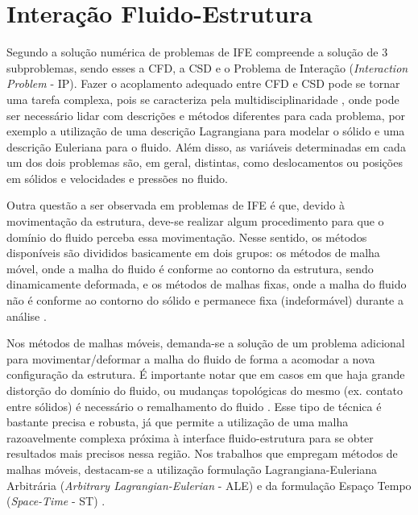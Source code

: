 \section{Interação Fluido-Estrutura} \label{IFE}

Segundo  a solução numérica de problemas de IFE compreende a solução de 3 subproblemas, sendo esses a CFD, a CSD e o Problema de Interação (\textit{Interaction Problem} - IP). Fazer o acoplamento adequado entre CFD e CSD pode se tornar uma tarefa complexa, pois se caracteriza pela multidisciplinaridade \cite{hou2012numerical}, onde pode ser necessário lidar com descrições e métodos diferentes para cada problema, por exemplo a utilização de uma descrição Lagrangiana para modelar o sólido e uma descrição Euleriana para o fluido. Além disso, as variáveis determinadas em cada um dos dois problemas são, em geral, distintas, como deslocamentos ou posições em sólidos e velocidades e pressões no fluido.

Outra questão a ser observada em problemas de IFE é que, devido à movimentação da estrutura, deve-se realizar algum procedimento para que o domínio do fluido perceba essa movimentação. Nesse sentido, os métodos disponíveis são divididos basicamente em dois grupos: os métodos de malha móvel, onde a malha do fluido é conforme ao contorno da estrutura, sendo dinamicamente deformada, e os métodos de malhas fixas, onde a malha do fluido não é conforme ao contorno do sólido e permanece fixa (indeformável) durante a análise \cite{fernandes2020tecnica}.

Nos métodos de malhas móveis, demanda-se a solução de um problema adicional para movimentar/deformar a malha do fluido de forma a acomodar a nova configuração da estrutura. É importante notar que em casos em que haja grande distorção do domínio do fluido, ou mudanças topológicas do mesmo (ex. contato entre sólidos) é necessário o remalhamento do fluido \cite{terahara2020heart}. Esse tipo de técnica é bastante precisa e robusta, já que permite a utilização de uma malha razoavelmente complexa próxima à interface fluido-estrutura para se obter resultados mais precisos nessa região. Nos trabalhos que empregam métodos de malhas móveis, destacam-se a utilização formulação Lagrangiana-Euleriana Arbitrária (\textit{Arbitrary Lagrangian-Eulerian} - ALE) \cite{donea1982arbitrary,kanchi20073d,fernandes2019ale} e da formulação Espaço Tempo (\textit{Space-Time} - ST) \cite{takizawa2011multiscale,terahara2020heart,takizawa2011stabilized}.

